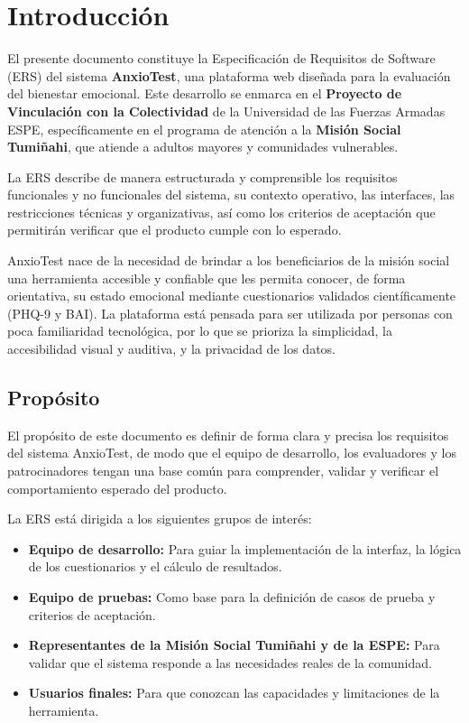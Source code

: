 \section{Introducción}
\label{sec:introduccion}

El presente documento constituye la Especificación de Requisitos de Software (ERS) del sistema \textbf{AnxioTest}, una plataforma web diseñada para la evaluación del bienestar emocional. Este desarrollo se enmarca en el \textbf{Proyecto de Vinculación con la Colectividad} de la Universidad de las Fuerzas Armadas ESPE, específicamente en el programa de atención a la \textbf{Misión Social Tumiñahi}, que atiende a adultos mayores y comunidades vulnerables.

La ERS describe de manera estructurada y comprensible los requisitos funcionales y no funcionales del sistema, su contexto operativo, las interfaces, las restricciones técnicas y organizativas, así como los criterios de aceptación que permitirán verificar que el producto cumple con lo esperado.

AnxioTest nace de la necesidad de brindar a los beneficiarios de la misión social una herramienta accesible y confiable que les permita conocer, de forma orientativa, su estado emocional mediante cuestionarios validados científicamente (PHQ-9 y BAI). La plataforma está pensada para ser utilizada por personas con poca familiaridad tecnológica, por lo que se prioriza la simplicidad, la accesibilidad visual y auditiva, y la privacidad de los datos.

\subsection{Propósito}
\label{sec:proposito}

El propósito de este documento es definir de forma clara y precisa los requisitos del sistema AnxioTest, de modo que el equipo de desarrollo, los evaluadores y los patrocinadores tengan una base común para comprender, validar y verificar el comportamiento esperado del producto.

La ERS está dirigida a los siguientes grupos de interés:

\begin{itemize}
  \item \textbf{Equipo de desarrollo:} Para guiar la implementación de la interfaz, la lógica de los cuestionarios y el cálculo de resultados.
  \item \textbf{Equipo de pruebas:} Como base para la definición de casos de prueba y criterios de aceptación.
  \item \textbf{Representantes de la Misión Social Tumiñahi y de la ESPE:} Para validar que el sistema responde a las necesidades reales de la comunidad.
  \item \textbf{Usuarios finales:} Para que conozcan las capacidades y limitaciones de la herramienta.
\end{itemize}

